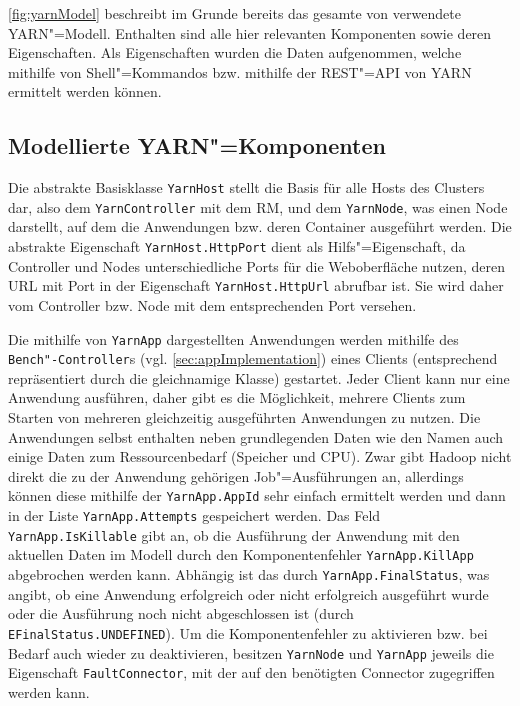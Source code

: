 \autoref{fig:yarnModel} beschreibt im Grunde bereits das gesamte von \sS verwendete YARN"=Modell.
Enthalten sind alle hier relevanten Komponenten sowie deren Eigenschaften.
Als Eigenschaften wurden die Daten aufgenommen, welche mithilfe von Shell"=Kommandos bzw. mithilfe der REST"=API von YARN ermittelt werden können.

\subsection{Modellierte YARN"=Komponenten}%

Die abstrakte Basisklasse \texttt{YarnHost} stellt die Basis für alle Hosts des Clusters dar, also dem \texttt{YarnController} mit dem \ac{RM}, und dem \texttt{YarnNode}, was einen Node darstellt, auf dem die Anwendungen bzw. deren Container ausgeführt werden.
Die abstrakte Eigenschaft \texttt{YarnHost.HttpPort} dient als Hilfs"=Eigenschaft, da Controller und Nodes unterschiedliche Ports für die Weboberfläche nutzen, deren URL mit Port in der Eigenschaft \texttt{YarnHost.HttpUrl} abrufbar ist.
Sie wird daher vom Controller bzw. Node mit dem entsprechenden Port versehen.

Die mithilfe von \texttt{YarnApp} dargestellten Anwendungen werden mithilfe des \texttt{Bench"-Controller}s (vgl. \autoref{sec:appImplementation}) eines Clients (entsprechend repräsentiert durch die gleichnamige Klasse) gestartet.
Jeder Client kann nur eine Anwendung ausführen, daher gibt es die Möglichkeit, mehrere Clients zum Starten von mehreren gleichzeitig ausgeführten Anwendungen zu nutzen.
Die Anwendungen selbst enthalten neben grundlegenden Daten wie \zB den Namen auch einige Daten zum Ressourcenbedarf (Speicher und CPU).
Zwar gibt Hadoop nicht direkt die zu der Anwendung gehörigen Job"=Ausführungen an, allerdings können diese mithilfe der \texttt{YarnApp.AppId} sehr einfach ermittelt werden und dann in der Liste \texttt{YarnApp.Attempts} gespeichert werden.
Das Feld \texttt{YarnApp.IsKillable} gibt an, ob die Ausführung der Anwendung mit den aktuellen Daten im Modell durch den Komponentenfehler \texttt{YarnApp.KillApp} abgebrochen werden kann.
Abhängig ist das durch \texttt{YarnApp.FinalStatus}, was angibt, ob eine Anwendung erfolgreich oder nicht erfolgreich ausgeführt wurde oder die Ausführung noch nicht abgeschlossen ist (durch \texttt{EFinalStatus.UNDEFINED}).
Um die Komponentenfehler zu aktivieren bzw. bei Bedarf auch wieder zu deaktivieren, besitzen \texttt{YarnNode} und \texttt{YarnApp} jeweils die Eigenschaft \texttt{FaultConnector}, mit der auf den benötigten Connector zugegriffen werden kann.

